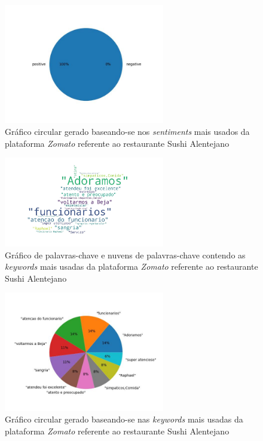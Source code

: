 \begin{figure}[!htb]
\centering
\includegraphics[width=7cm]{figuras/Zomato/Restaurants/restaurante2_sentiments.jpeg}
\caption{Gráfico circular gerado baseando-se nos \textit{sentiments} mais usados da plataforma \textit{Zomato} referente ao restaurante Sushi Alentejano}
\label{fig:exemplofig}
\end{figure}

\begin{figure}[!htb]
\centering
\includegraphics[width=7cm]{figuras/Zomato/Restaurants/restaurante2_keywordcloud.jpeg}
\caption{Gráfico de palavras-chave e nuvens de palavras-chave contendo as \textit{keywords} mais usadas da plataforma \textit{Zomato} referente ao restaurante Sushi Alentejano}
\label{fig:exemplofig}
\end{figure}

\begin{figure}[!htb]
\centering
\includegraphics[width=7cm]{figuras/Zomato/Restaurants/restaurante2_keywords.jpeg}
\caption{Gráfico circular gerado baseando-se nas \textit{keywords} mais usadas da plataforma \textit{Zomato} referente ao restaurante Sushi Alentejano}
\label{fig:exemplofig}
\end{figure}


